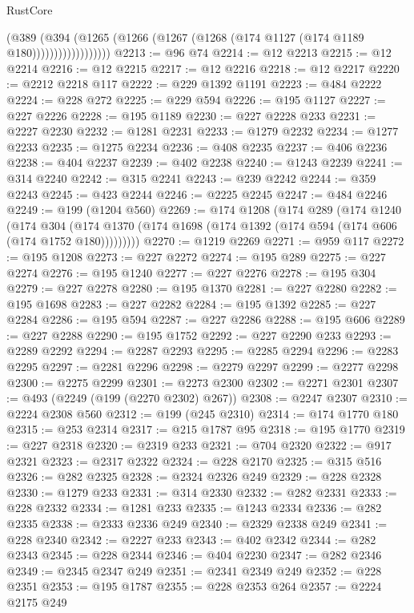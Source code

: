 \begin{lexlean}{RustCore}
\begin{coremodule}
                        (@389
                          (@394
                            (@1265
                              (@1266 (@1267 (@1268 (@174 @1127 (@174 @1189 @180))))))))))))))))))
@2213 := @96 @74
@2214 := @12 @2213
@2215 := @12 @2214
@2216 := @12 @2215
@2217 := @12 @2216
@2218 := @12 @2217
@2220 := @2212 @2218 @117
@2222 := @229 @1392 @1191
@2223 := @484 @2222
@2224 := @228 @272
@2225 := @229 @594
@2226 := @195 @1127
@2227 := @227 @2226
@2228 := @195 @1189
@2230 := @227 @2228 @233
@2231 := @2227 @2230
@2232 := @1281 @2231
@2233 := @1279 @2232
@2234 := @1277 @2233
@2235 := @1275 @2234
@2236 := @408 @2235
@2237 := @406 @2236
@2238 := @404 @2237
@2239 := @402 @2238
@2240 := @1243 @2239
@2241 := @314 @2240
@2242 := @315 @2241
@2243 := @239 @2242
@2244 := @359 @2243
@2245 := @423 @2244
@2246 := @2225 @2245
@2247 := @484 @2246
@2249 := @199 (@1204 @560)
@2269 := @174
    @1208
    (@174
      @289
      (@174
        @1240
        (@174
          @304
          (@174 @1370 (@174 @1698 (@174 @1392 (@174 @594 (@174 @606 (@174 @1752 @180)))))))))
@2270 := @1219 @2269
@2271 := @959 @117
@2272 := @195 @1208
@2273 := @227 @2272
@2274 := @195 @289
@2275 := @227 @2274
@2276 := @195 @1240
@2277 := @227 @2276
@2278 := @195 @304
@2279 := @227 @2278
@2280 := @195 @1370
@2281 := @227 @2280
@2282 := @195 @1698
@2283 := @227 @2282
@2284 := @195 @1392
@2285 := @227 @2284
@2286 := @195 @594
@2287 := @227 @2286
@2288 := @195 @606
@2289 := @227 @2288
@2290 := @195 @1752
@2292 := @227 @2290 @233
@2293 := @2289 @2292
@2294 := @2287 @2293
@2295 := @2285 @2294
@2296 := @2283 @2295
@2297 := @2281 @2296
@2298 := @2279 @2297
@2299 := @2277 @2298
@2300 := @2275 @2299
@2301 := @2273 @2300
@2302 := @2271 @2301
@2307 := @493 (@2249 (@199 (@2270 @2302) @267))
@2308 := @2247 @2307
@2310 := @2224 @2308 @560
@2312 := @199 (@245 @2310)
@2314 := @174 @1770 @180
@2315 := @253 @2314
@2317 := @215 @1787 @95
@2318 := @195 @1770
@2319 := @227 @2318
@2320 := @2319 @233
@2321 := @704 @2320
@2322 := @917 @2321
@2323 := @2317 @2322
@2324 := @228 @2170
@2325 := @315 @516
@2326 := @282 @2325
@2328 := @2324 @2326 @249
@2329 := @228 @2328
@2330 := @1279 @233
@2331 := @314 @2330
@2332 := @282 @2331
@2333 := @228 @2332
@2334 := @1281 @233
@2335 := @1243 @2334
@2336 := @282 @2335
@2338 := @2333 @2336 @249
@2340 := @2329 @2338 @249
@2341 := @228 @2340
@2342 := @2227 @233
@2343 := @402 @2342
@2344 := @282 @2343
@2345 := @228 @2344
@2346 := @404 @2230
@2347 := @282 @2346
@2349 := @2345 @2347 @249
@2351 := @2341 @2349 @249
@2352 := @228 @2351
@2353 := @195 @1787
@2355 := @228 @2353 @264
@2357 := @2224 @2175 @249

\end{coremodule}
\end{lexlean}
